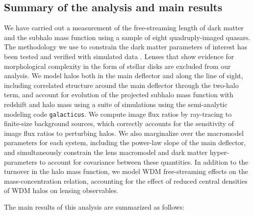 \subsection{Summary of the analysis and main results}
\label{ssec:mainsummary}
We have carried out a measurement of the free-streaming length of dark matter and the subhalo mass function using a sample of eight quadruply-imaged quasars. The methodology we use to constrain the dark matter parameters of interest has been tested and verified with simulated data \citep{Gilman++19}. Lenses that show evidence for morphological complexity in the form of stellar disks are excluded from our analysis. We model halos both in the main deflector and along the line of sight, including correlated structure around the main deflector through the two-halo term, and account for evolution of the projected subhalo mass function with redshift and halo mass using a suite of simulations using the semi-analytic modeling code {\tt{galacticus}}. We compute image flux ratios by ray-tracing to finite-size background sources, which correctly accounts for the sensitivity of image flux ratios to perturbing halos. We also marginalize over the macromodel parameters for each system, including the power-law slope of the main deflector, and simultaneously constrain the lens macromodel and dark matter hyper-parameters to account for covariance between these quantities. In addition to the turnover in the halo mass function, we model WDM free-streaming effects on the mass-concentration relation, accounting for the effect of reduced central densities of WDM halos on lensing observables. 

The main results of this analysis are summarized as follows:

